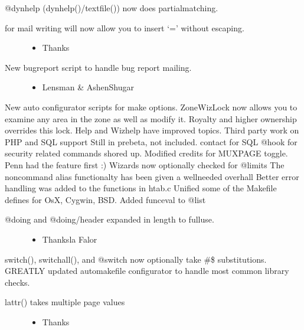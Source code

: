\documentclass[letterpaper,10pt,english]{sphinxmanual}
\begin{document}
\sphinxAtStartPar
@dynhelp (dynhelp()/textfile()) now does partial\sphinxhyphen{}matching.
\begin{description}
\item[{\sphinxhyphen{} for mail writing will now allow you to insert ‘=’ without escaping.}] \leavevmode\begin{itemize}
\item {} 
\sphinxAtStartPar
Thanks 

\end{itemize}

\item[{New bugreport script to handle bug report mailing.}] \leavevmode\begin{itemize}
\item {} 
\sphinxAtStartPar
Lensman \& Ashen\sphinxhyphen{}Shugar

\end{itemize}

\end{description}

\sphinxAtStartPar
New auto configurator scripts for make options.
ZoneWizLock now allows you to examine any area in the zone as well as modify it.  Royalty and higher ownership overrides this lock.
Help and Wizhelp have improved topics.
Third party work on PHP and SQL support \sphinxhyphen{} Still in pre\sphinxhyphen{}beta, not included.  contact  for SQL
@hook for security related commands shored up.
Modified credits for MUXPAGE toggle.  Penn had the feature first :)
Wizards now optionally checked for @limits
The non\sphinxhyphen{}command alias functionalty has been given a well\sphinxhyphen{}needed overhall
Better error handling was added to the functions in htab.c
Unified some of the Makefile defines for OsX, Cygwin, BSD.
Added funceval to @list
\begin{description}
\item[{@doing and @doing/header expanded in length to full\sphinxhyphen{}use.}] \leavevmode\begin{itemize}
\item {} 
\sphinxAtStartPar
Thanksla Falor

\end{itemize}

\end{description}

\sphinxAtStartPar
switch(), switchall(), and @switch now optionally take \#\$ substitutions.
GREATLY updated auto\sphinxhyphen{}makefile configurator to handle most common library checks.
\begin{description}
\item[{lattr() takes multiple page values}] \leavevmode\begin{itemize}
\item {} 
\sphinxAtStartPar
Thanks 

\end{itemize}

\end{description}
\end{document}
